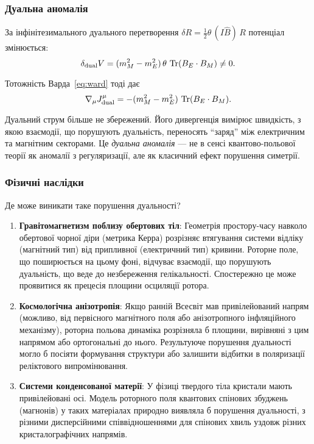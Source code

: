 \documentclass[11pt,a4paper]{article}
\numberwithin{equation}{section}
\theoremstyle{plain}
\theoremstyle{definition}
\theoremstyle{remark}
\DeclareMathOperator{\Tr}{Tr}
\begin{document}
\subsubsection{Дуальна аномалія}

За інфінітезимального дуального перетворення $\delta R = \frac{1}{2}\theta\,(I\hat{B})\,R$ потенціал змінюється:
\begin{equation}
\delta_{\rm dual} V = (m_M^2 - m_E^2)\,\theta\,\Tr(B_E\cdot B_M) \neq 0.
\end{equation}

Тотожність Варда~\eqref{eq:ward} тоді дає
\begin{equation}
\nabla_\mu J^\mu_{\rm dual} = -(m_M^2 - m_E^2)\,\Tr(B_E\cdot B_M).
\end{equation}

Дуальний струм більше не збережений. Його дивергенція вимірює швидкість, з якою взаємодії, що порушують дуальність, переносять ``заряд'' між електричним та магнітним секторами. Це \emph{дуальна аномалія} — не в сенсі квантово-польової теорії як аномалії з регуляризації, але як класичний ефект порушення симетрії.

\subsubsection{Фізичні наслідки}

Де може виникати таке порушення дуальності?

\begin{enumerate}
  \item \textbf{Гравітомагнетизм поблизу обертових тіл}: Геометрія простору-часу навколо обертової чорної діри (метрика Керра) розрізняє втягування системи відліку (магнітний тип) від припливної (електричний тип) кривини. Роторне поле, що поширюється на цьому фоні, відчуває взаємодії, що порушують дуальність, що веде до незбереження гелікальності. Спостережно це може проявитися як прецесія площини осциляції ротора.

  \item \textbf{Космологічна анізотропія}: Якщо ранній Всесвіт мав привілейований напрям (можливо, від первісного магнітного поля або анізотропного інфляційного механізму), роторна польова динаміка розрізняла б площини, вирівняні з цим напрямом або ортогональні до нього. Результуюче порушення дуальності могло б посіяти формування структури або залишити відбитки в поляризації реліктового випромінювання.

  \item \textbf{Системи конденсованої матерії}: У фізиці твердого тіла кристали мають привілейовані осі. Модель роторного поля квантових спінових збуджень (магнонів) у таких матеріалах природно виявляла б порушення дуальності, з різними дисперсійними співвідношеннями для спінових хвиль уздовж різних кристалографічних напрямів.
\end{enumerate}
\end{document}
